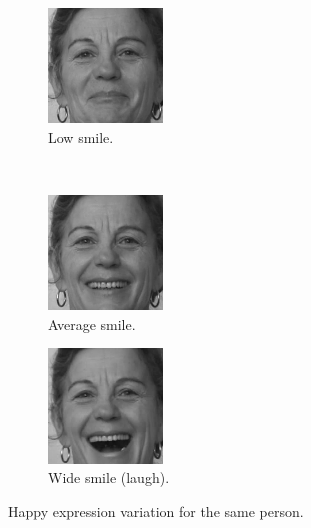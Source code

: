 \begin{figure}[tb]
	\centering
	\begin{subfigure}[t]{0.3\textwidth}
		\centering
		\includegraphics[height=1.2in]{Chapter5/Figs/SamePersonSmile1.png}
		\caption{Low smile.}
		\label{fig:SamePersonSmile1}
	\end{subfigure}%
	~ 
	\begin{subfigure}[t]{0.3\textwidth}
		\centering
		\includegraphics[height=1.2in]{Chapter5/Figs/SamePersonSmile2.png}
		\caption{Average smile.}
		\label{fig:SamePersonSmile2}
	\end{subfigure}
	\begin{subfigure}[t]{0.3\textwidth}
		\centering
		\includegraphics[height=1.2in]{Chapter5/Figs/SamePersonSmile3.png}
		\caption{Wide smile (laugh).}
		\label{fig:SamePersonSmile3}
	\end{subfigure}
	
	\caption{Happy expression variation for the same person.}
\end{figure}


%    




